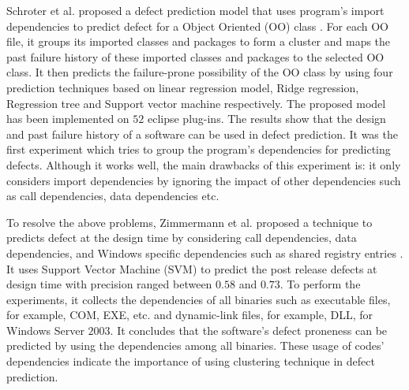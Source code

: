 \documentclass[12pt]{report}
\begin{document}
Schroter et al. proposed a defect prediction model that uses program's import dependencies to predict defect for a Object Oriented (OO) class \cite{schroter2006predicting}. For each OO file, it groups its imported classes and packages to form a cluster and maps the past failure history of these imported classes and packages to the selected OO class. It then predicts the failure-prone possibility of the OO class by using four prediction techniques based on linear regression model, Ridge regression, Regression tree and Support vector machine respectively. The proposed model has been implemented on $52$ eclipse plug-ins. The results show that the design and past failure history of a software can be used in defect prediction. It was the first experiment which tries to group the program's dependencies for predicting defects. Although it works well, the main drawbacks of this experiment is: it only considers import dependencies by ignoring the impact of other dependencies such as call dependencies, data dependencies etc. 


To resolve the above problems, Zimmermann et al. proposed a technique to predicts defect at the design time by considering call dependencies, data dependencies, and Windows specific dependencies such as shared registry entries \cite{zimmermann2007predicting}. It uses Support Vector Machine (SVM) to predict the post release defects at design time with precision ranged between $0.58$ and $0.73$. To perform the experiments, it collects the dependencies of all binaries such as executable files, for example, COM, EXE, etc. and dynamic-link files, for example, DLL, for Windows Server $2003$.  It concludes that the software's defect proneness can be predicted by using the dependencies among all binaries. These usage of codes' dependencies indicate the importance of using clustering technique in defect prediction. 
\end{document}
